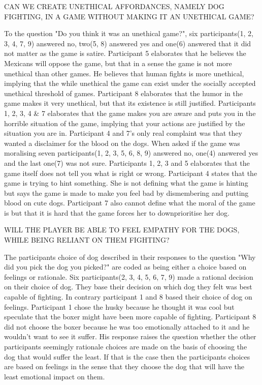 CAN WE CREATE UNETHICAL AFFORDANCES, NAMELY DOG FIGHTING, IN A GAME WITHOUT MAKING IT AN UNETHICAL GAME?

To the question "Do you think it was an unethical game?", six participants(1, 2, 3, 4, 7, 9) answered no, two(5, 8) answered yes and one(6) answered that it did not matter as the game is satire. Participant 5 elaborates that he believes the Mexicans will oppose the game, but that in a sense the game is not more unethical than other games. He believes that human fights is more unethical, implying that the while unethical the game can exist under the socially accepted unethical threshold of games. Participant 8 elaborates that the humor in the game makes it very unethical, but that its existence is still justified. Participants 1, 2, 3, 4 & 7 elaborates that the game makes you are aware and puts you in the horrible situation of the game, implying that your actions are justified by the situation you are in. Participant 4 and 7's only real complaint was that they wanted a disclaimer for the blood on the dogs.
When asked if the game was moralising seven participants(1, 2, 3, 5, 6, 8, 9) answered no, one(4) answered yes and the last one(7) was not sure. Participants 1, 2, 3 and 5 elaborates that the game itself does not tell you what is right or wrong. Participant 4 states that the game is trying to hint something. She is not defining what the game is hinting but says the game is made to make you feel bad by dismembering and putting blood on cute dogs. Participant 7 also cannot define what the moral of the game is but that it is hard that the game forces her to downprioritise her dog. 


WILL THE PLAYER BE ABLE TO FEEL EMPATHY FOR THE DOGS, WHILE BEING RELIANT ON THEM FIGHTING?

The participants choice of dog described in their responses to the question "Why did you pick the dog you picked?" are coded as being either a choice based on feelings or rationale. Six participants(2, 3, 4, 5, 6, 7, 9) made a rational decision on their choice of dog. They base their decision on which dog they felt was best capable of fighting. In contrary participant 1 and 8 based their choice of dog on feelings. Participant 1 chose the husky because he thought it was cool but speculate that the boxer might have been more capable of fighting. Participant 8 did not choose the boxer because he was too emotionally attached to it and he wouldn't want to see it suffer. His response raises the question whether the other participants seemingly rationale choices are made on the basis of choosing the dog that would suffer the least. If that is the case then the participants choices are based on feelings in the sense that they choose the dog that will have the least emotional impact on them.



